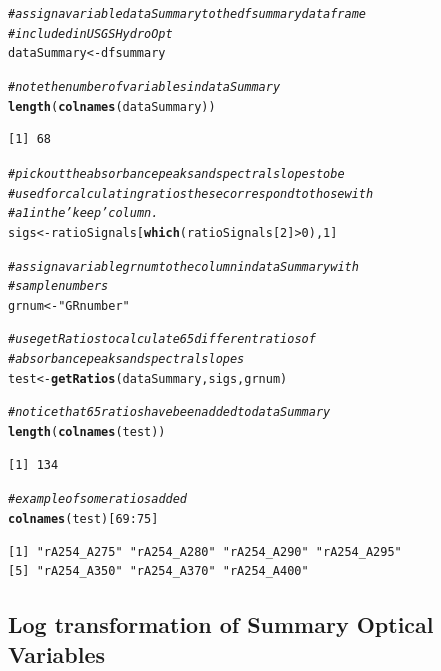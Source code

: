 \documentclass[a4paper,11pt]{article}\usepackage[]{graphicx}\usepackage[]{color}
\makeatletter
\newcommand{\hlnum}[1]{\textcolor[rgb]{0.686,0.059,0.569}{#1}}%
\newcommand{\hlstr}[1]{\textcolor[rgb]{0.192,0.494,0.8}{#1}}%
\newcommand{\hlcom}[1]{\textcolor[rgb]{0.678,0.584,0.686}{\textit{#1}}}%
\newcommand{\hlopt}[1]{\textcolor[rgb]{0,0,0}{#1}}%
\newcommand{\hlstd}[1]{\textcolor[rgb]{0.345,0.345,0.345}{#1}}%
\newcommand{\hlkwb}[1]{\textcolor[rgb]{0.69,0.353,0.396}{#1}}%
\newcommand{\hlkwd}[1]{\textcolor[rgb]{0.737,0.353,0.396}{\textbf{#1}}}%
\newenvironment{kframe}{%
 \def\at@end@of@kframe{}%
 \ifinner\ifhmode%
  \def\at@end@of@kframe{\end{minipage}}%
  \begin{minipage}{\columnwidth}%
 \fi\fi%
 \def\FrameCommand##1{\hskip\@totalleftmargin \hskip-\fboxsep
 \colorbox{shadecolor}{##1}\hskip-\fboxsep
     \hskip-\linewidth \hskip-\@totalleftmargin \hskip\columnwidth}%
 \MakeFramed {\advance\hsize-\width
   \@totalleftmargin\z@ \linewidth\hsize
   \@setminipage}}%
 {\par\unskip\endMakeFramed%
 \at@end@of@kframe}
\newenvironment{knitrout}{}{} %
\makeatother
\begin{document}
\begin{knitrout}
\color{fgcolor}\begin{kframe}
\begin{alltt}
\hlcom{# assign a variable dataSummary to the dfsummary dataframe}
\hlcom{# included in USGSHydroOpt}
\hlstd{dataSummary} \hlkwb{<-} \hlstd{dfsummary}

\hlcom{# note the number of variables in dataSummary}
\hlkwd{length}\hlstd{(}\hlkwd{colnames}\hlstd{(dataSummary))}
\end{alltt}
\begin{verbatim}
[1] 68
\end{verbatim}
\begin{alltt}
\hlcom{# pick out the absorbance peaks and spectral slopes to be}
\hlcom{# used for calculating ratios these correspond to those with}
\hlcom{# a 1 in the 'keep' column.}
\hlstd{sigs} \hlkwb{<-} \hlstd{ratioSignals[}\hlkwd{which}\hlstd{(ratioSignals[}\hlnum{2}\hlstd{]} \hlopt{>} \hlnum{0}\hlstd{),} \hlnum{1}\hlstd{]}

\hlcom{# assign a variable grnum to the column in dataSummary with}
\hlcom{# sample numbers}
\hlstd{grnum} \hlkwb{<-} \hlstr{"GRnumber"}

\hlcom{# use getRatios to calculate 65 different ratios of}
\hlcom{# absorbance peaks and spectral slopes}
\hlstd{test} \hlkwb{<-} \hlkwd{getRatios}\hlstd{(dataSummary, sigs, grnum)}

\hlcom{# notice that 65 ratios have been added to dataSummary}
\hlkwd{length}\hlstd{(}\hlkwd{colnames}\hlstd{(test))}
\end{alltt}
\begin{verbatim}
[1] 134
\end{verbatim}
\begin{alltt}
\hlcom{# example of some ratios added}
\hlkwd{colnames}\hlstd{(test)[}\hlnum{69}\hlopt{:}\hlnum{75}\hlstd{]}
\end{alltt}
\begin{verbatim}
[1] "rA254_A275" "rA254_A280" "rA254_A290" "rA254_A295"
[5] "rA254_A350" "rA254_A370" "rA254_A400"
\end{verbatim}
\end{kframe}
\end{knitrout}

\subsection{Log transformation of Summary Optical Variables}
\end{document}
